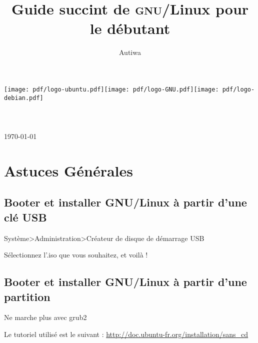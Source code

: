 \documentclass[a4paper,twoside]{article}
\title{Guide succint de \textsc{gnu}/Linux pour le débutant}
\author{Autiwa}
\begin{document}
\begin{titlepage}

\begin{center}

\vfill
\texttt{[image: pdf/logo-ubuntu.pdf]}\hfill\texttt{[image: pdf/logo-GNU.pdf]}\hfill\texttt{[image: pdf/logo-debian.pdf]}\\[1cm]

\HRule \\[0.4cm]
{ \huge \bfseries \makeatletter\@title\makeatother}\\[0.4cm]

\HRule \\[0.75cm]
{\large \today}\\[0.75cm]
\makeatletter
\@author
\makeatother
\vfill
{}
\vfill



\end{center}

\end{titlepage}

\tableofcontents
\newpage



\section{Astuces Générales}

\subsection{Booter et installer GNU/Linux à partir d'une clé USB}
Système>Administration>Créateur de disque de démarrage USB

Sélectionnez l'.iso que vous souhaitez, et voilà !

\subsection{Booter et installer GNU/Linux à partir d'une partition}\label{sec:hd-media}
{\red Ne marche plus avec grub2}

Le tutoriel utilisé est le suivant : \url{http://doc.ubuntu-fr.org/installation/sans_cd}
\end{document}
